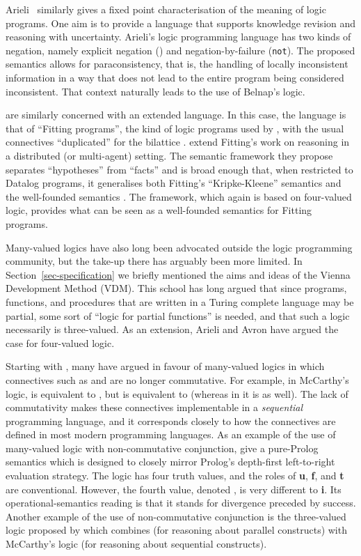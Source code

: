 \documentclass{tlp}
\begin{document}
Arieli~\cite{Arieli:AMAI02} similarly gives a fixed point
characterisation of the meaning of logic programs.
One aim is to provide a language that supports knowledge revision
and reasoning with uncertainty.
Arieli's logic programming language has two kinds of negation,
namely explicit negation () and negation-by-failure
(\texttt{not}).
The proposed semantics allows for paraconsistency, that is, the
handling of locally inconsistent information in a way that does
not lead to the entire program being considered inconsistent.
That context naturally leads to the use of Belnap's logic.

 are similarly concerned with an extended language.
In this case, the language is that of ``Fitting programs'', the kind
of logic programs used by , with the usual
connectives ``duplicated'' for the bilattice .
 extend Fitting's work on reasoning in a
distributed (or multi-agent) setting.
The semantic framework they propose separates ``hypotheses'' from
``facts'' and is broad enough that, when restricted to Datalog
programs, it generalises both Fitting's ``Kripke-Kleene'' semantics
\cite{Fitting85} and the well-founded semantics \cite{VanGelder91}.
The framework, which again is based on four-valued logic, provides
what can be seen as a well-founded semantics for Fitting programs.

Many-valued logics have also long been advocated outside 
the logic programming community, but
the take-up there has arguably been more limited. 
In Section~\ref{sec-specification} we briefly mentioned the aims and
ideas of the Vienna Development Method (VDM).
This school has long argued that since programs, functions, and 
procedures that are written in a Turing complete language may be partial,
some sort of ``logic for partial functions'' is needed,
and that such a logic necessarily is three-valued.
As an extension,
Arieli and Avron
\citeyear{arieli-avron:1996,arieli-avron:LICS1998}
have argued the case for four-valued logic.

Starting with ,
many have argued in favour of many-valued logics in which connectives
such as  and  are no longer commutative.
For example, in McCarthy's logic,  is 
equivalent to , but
 is equivalent to  
(whereas in  it is  as well).
The lack of commutativity makes these connectives implementable in 
a \emph{sequential} programming language,
and it corresponds closely to how the connectives are defined in
most modern programming languages.
As an example of the use of many-valued logic with non-commutative
conjunction,  give a pure-Prolog semantics 
which is designed to closely mirror Prolog's depth-first left-to-right
evaluation strategy.
The logic has four truth values, and the roles of \textbf{u},
\textbf{f}, and \textbf{t} are conventional.
However, the fourth value, denoted , is very different
to \textbf{i}.
Its operational-semantics reading is that it stands for
divergence preceded by success.
Another example of the use of non-commutative conjunction is
the three-valued logic proposed by 
which combines  (for reasoning about parallel constructs)
with McCarthy's logic (for reasoning about sequential constructs).
\end{document}

